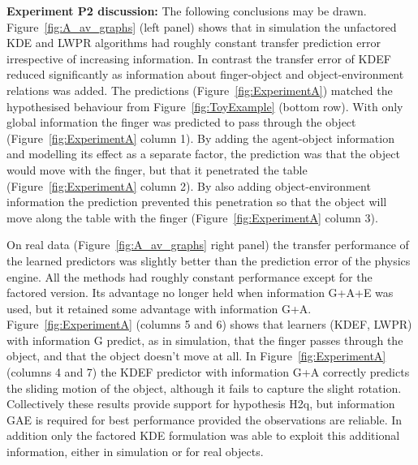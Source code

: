 {\bf Experiment P2 discussion:} The following conclusions may be
drawn. Figure~\ref{fig:A_av_graphs} (left panel) shows that in
simulation the unfactored KDE and LWPR algorithms had roughly constant
transfer prediction error irrespective of increasing information. In contrast
the transfer error of KDEF reduced significantly as information about
finger-object and object-environment relations was added. The
predictions (Figure~\ref{fig:ExperimentA}) matched the hypothesised
behaviour from Figure~\ref{fig:ToyExample} (bottom row). With only
global information the finger was predicted to pass through the object
(Figure~\ref{fig:ExperimentA} column 1). By adding the agent-object
information and modelling its effect as a separate factor, the
prediction was that the object would move with the finger, but that it
penetrated the table (Figure~\ref{fig:ExperimentA} column 2). By also
adding object-environment information the prediction prevented this
penetration so that the object will move along the table with the
finger (Figure~\ref{fig:ExperimentA} column 3).

On real data (Figure~\ref{fig:A_av_graphs} right panel) the transfer
performance of the learned predictors was slightly better than the
prediction error of the physics engine. All the methods had roughly
constant performance except for the factored version. Its advantage
no longer held when information G+A+E was used, but it retained some
advantage with information G+A. Figure~\ref{fig:ExperimentA}
(columns 5 and 6) shows that learners (KDEF, LWPR) with information G
predict, as in simulation, that the finger passes through the object,
and that the object doesn't move at all. In
Figure~\ref{fig:ExperimentA} (columns 4 and 7) the KDEF predictor
with information G+A correctly predicts the sliding motion of the
object, although it fails to capture the slight rotation. Collectively
these results provide support for hypothesis H2q, but information GAE is required for best performance provided the observations are reliable. In addition only
the factored KDE formulation was able to exploit this additional
information, either in simulation or for real objects. 


